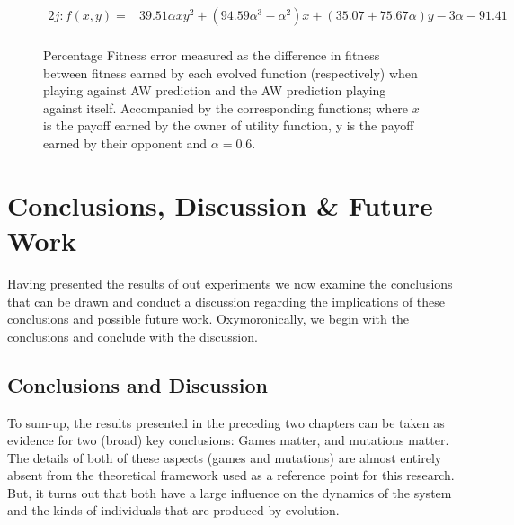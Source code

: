 \documentclass[11pt]{book}
\begin{document}
\begin{figure}
\begin{alignat*}{2}
		j: f(x, y) = & 39.51\alpha xy^2 + (94.59\alpha^3 - \alpha^2)x + (35.07 + 75.67\alpha)y - 3\alpha - 91.41\\
	\end{alignat*}
	\caption{Percentage Fitness error measured as the difference in fitness between fitness earned by each evolved function (respectively) when playing against AW prediction and the AW prediction playing against itself. Accompanied by the corresponding functions; where $x$ is the payoff earned by the owner of utility function, y is the payoff earned by their opponent and $\alpha = 0.6$.}
	\label{barchart_fitness_earned_against_target_asymmetric_r_06}
\end{figure}


\chapter{Conclusions, Discussion \& Future Work}\label{conclusions_and_discussion}

Having presented the results of out experiments we now examine the conclusions that can be drawn and conduct a discussion regarding the implications of these conclusions and possible future work.
Oxymoronically, we begin with the conclusions and conclude with the discussion.

\section{Conclusions and Discussion}\label{conclusions}

To sum-up, the results presented in the preceding two chapters can be taken as evidence for two (broad) key conclusions: Games matter, and mutations matter.
The details of both of these aspects (games and mutations) are almost entirely absent from the theoretical framework used as a reference point for this research.
But, it turns out that both have a large influence on the dynamics of the system and the kinds of individuals that are produced by evolution.
\end{document}
